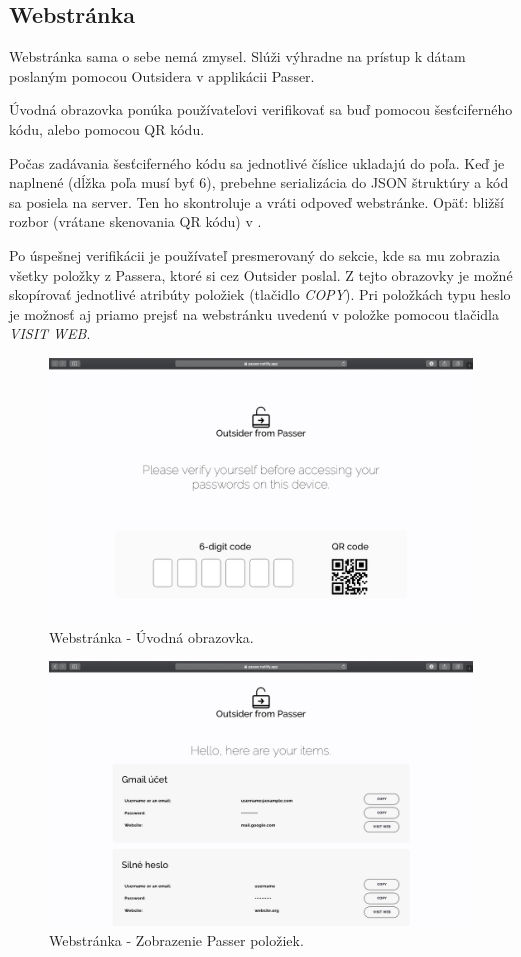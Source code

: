 \subsection{Webstránka}
\label{webstranka}
Webstránka sama o sebe nemá zmysel. Slúži výhradne na prístup k dátam poslaným pomocou Outsidera v applikácii Passer.

Úvodná obrazovka ponúka používateľovi verifikovať sa buď pomocou šesťciferného kódu, alebo pomocou QR kódu. 

Počas zadávania šesťciferného kódu sa jednotlivé číslice ukladajú do poľa. Keď je naplnené (dĺžka poľa musí byť 6), prebehne serializácia do JSON štruktúry a kód sa posiela na server. Ten ho skontroluje a vráti odpoveď webstránke. Opäť: bližší rozbor (vrátane skenovania QR kódu) v .

Po úspešnej verifikácii je používateľ presmerovaný do sekcie, kde sa mu zobrazia všetky položky z Passera, ktoré si cez Outsider poslal. Z tejto obrazovky je možné skopírovať jednotlivé atribúty položiek (tlačidlo \textit{COPY}). Pri položkách typu heslo je možnosť aj priamo prejsť na webstránku uvedenú v položke pomocou tlačidla \textit{VISIT WEB}. 

\begin{figure}[H]
  \centering
  \includegraphics[width=15cm]{img/website1.png}
  \caption{Webstránka - Úvodná obrazovka.}
  \label{website1}
\end{figure}

\begin{figure}[H]
  \centering
  \includegraphics[width=15cm]{img/website2.png}
  \caption{Webstránka - Zobrazenie Passer položiek.}
  \label{website2}
\end{figure}